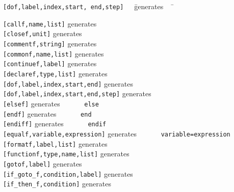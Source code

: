 \begin{tabbing}
  {\tt [dof,{\rm label},{\rm index},{\rm start},
       {\rm end},{\rm step}]}\ \ \ \=
       generates\ \ \ \= \kill

  {\tt [callf,{\rm name},{\rm list}]} 
     \>generates
     \\
  {\tt [closef,{\rm unit}]}
     \>generates
     \\
  {\tt [commentf,{\rm string}]} \>generates
    \\
  {\tt [commonf,{\rm name},{\rm list}]} 
     \>generates
     \\
  {\tt [continuef,{\rm label}]} \>generates
     \\
  {\tt [declaref,{\rm type},{\rm list}]} 
     \>generates
     \\
  {\tt [dof,{\rm label},{\rm index},{\rm start},{\rm end}]}
     \>generates
     \\
  {\tt [dof,{\rm label},{\rm index},{\rm start},{\rm end},{\rm step}]}
     \>generates 
     \\
  {\tt [elsef]} \>generates\> {\tt\ \ \ \ \ \ else}\\
  {\tt [endf]} \>generates\> {\tt\ \ \ \ \ \ end}\\
  {\tt [endiff]} \>generates\> {\tt\ \ \ \ \ \ endif}\\
  {\tt [equalf,{\rm variable},{\rm expression}]} 
    \>generates\> 
    {\tt\ \ \ \ \ \ {\rm variable}={\rm expression}}\\
  {\tt [formatf,{\rm label},{\rm list}]} \>generates
    \\
  {\tt [functionf,{\rm type},{\rm name},{\rm list}]} 
     \>generates
     \\
  {\tt [gotof,{\rm label}]} \>generates 
    \\
  {\tt [if\_goto\_f,{\rm condition},{\rm label}]} 
    \>generates
    \\
  {\tt [if\_then\_f,{\rm condition}]} \>generates

\end{tabbing}
